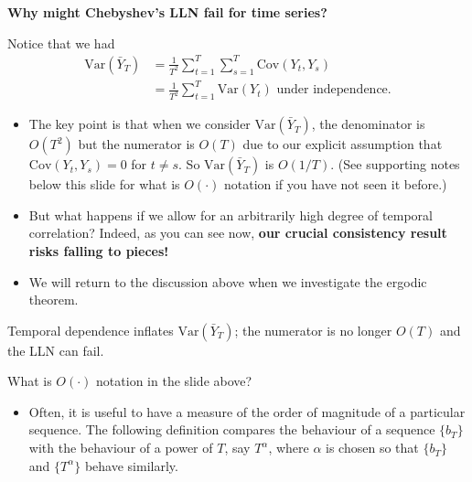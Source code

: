 \documentclass[
  letterpaper,
  DIV=11,
  numbers=noendperiod]{scrartcl}
\providecommand{\tightlist}{%
  \setlength{\itemsep}{0pt}\setlength{\parskip}{0pt}}
\newcommand{\slidelabel}[1]{{\color{embernavy}\bfseries\large #1\par\vspace{5pt}}}
\newenvironment{slidefooter}{%
  \par\vspace{7pt}{\color{emberrule}\rule{\linewidth}{0.4pt}}\par\vspace{4pt}%
  \color{emberamber}\itshape\small}{\par}
\begin{document}
\begin{slidebox}

\slidelabel{Why might Chebyshev's LLN fail for time series?}

Notice that we had
\[\begin{aligned} \text{Var}(\bar{Y}_T) &= \frac{1}{T^2}\sum_{t=1}^{T}\sum_{s=1}^{T}\text{Cov}(Y_t, Y_s) \\ &= \frac{1}{T^2}\sum_{t=1}^{T}\text{Var}(Y_t) \text{ under independence.} \end{aligned}\]

\begin{itemize}
\item
  The key point is that when we consider \(\text{Var}(\bar{Y}_T)\), the
  denominator is \(O(T^2)\) but the numerator is \(O(T)\) due to our
  explicit assumption that \(\text{Cov}(Y_t, Y_s) = 0\) for
  \(t \neq s\). So \(\text{Var}(\bar{Y}_T)\) is \(O(1/T)\). (See
  supporting notes below this slide for what is \(O(\cdot)\) notation if
  you have not seen it before.)
\item
  But what happens if we allow for an arbitrarily high degree of
  temporal correlation? Indeed, as you can see now, \textbf{our crucial
  consistency result risks falling to pieces!}
\item
  We will return to the discussion above when we investigate the ergodic
  theorem.
\end{itemize}

\begin{slidefooter}

Temporal dependence inflates \(\text{Var}(\bar{Y}_T)\); the numerator is
no longer \(O(T)\) and the LLN can fail.

\end{slidefooter}

\end{slidebox}

What is \(O(\cdot)\) notation in the slide above?

\begin{itemize}
\tightlist
\item
  Often, it is useful to have a measure of the order of magnitude of a
  particular sequence. The following definition compares the behaviour
  of a sequence \(\{b_T\}\) with the behaviour of a power of \(T\), say
  \(T^\alpha\), where \(\alpha\) is chosen so that \(\{b_T\}\) and
  \(\{T^\alpha\}\) behave similarly.
\end{itemize}
\end{document}
